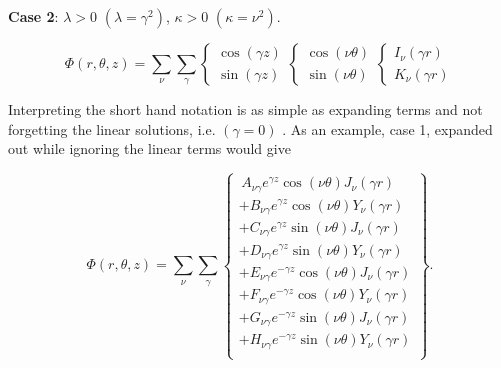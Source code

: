 \documentclass[12pt]{article}
\begin{document}
{\bf Case 2}: $\lambda > 0$ $(\lambda = \gamma^2)$, $\kappa > 0$ $(\kappa = \nu^2)$.

\begin{equation}
\Phi \left ( r,\theta,z \right) =  \sum_{\nu} \sum_{\gamma} \left \{ \begin{array}{c}
        \cos (\gamma z) \\
        \sin (\gamma z)
           \end{array} \right .
     \left \{ \begin{array}{c}
        \cos (\nu \theta) \\
        \sin (\nu \theta)
           \end{array} \right .
        \left \{ \begin{array}{c}
        I_{\nu}(\gamma  r) \\
        K_{\nu}(\gamma  r)
           \end{array} \right .
\end{equation}

Interpreting the short hand notation is as simple as expanding terms and not forgetting the linear solutions, i.e. $(\gamma = 0)$ .
As an example, case 1, expanded out while ignoring the linear terms would give

\begin{equation}
\Phi \left ( r,\theta,z \right) =  \sum_{\nu} \sum_{\gamma}  \left \{ \begin{array}{c}
   \,  A_{\nu \gamma} e^{\gamma z} \cos (\nu \theta) J_{\nu}(\gamma  r) \\
   + B_{\nu \gamma} e^{\gamma z} \cos (\nu \theta) Y_{\nu}(\gamma  r) \\
   + C_{\nu \gamma} e^{\gamma z} \sin (\nu \theta) J_{\nu}(\gamma  r) \\
   + D_{\nu \gamma} e^{\gamma z} \sin (\nu \theta) Y_{\nu}(\gamma  r) \\
   + E_{\nu \gamma} e^{-\gamma z} \cos (\nu \theta) J_{\nu}(\gamma  r) \\
   + F_{\nu \gamma} e^{-\gamma z} \cos (\nu \theta) Y_{\nu}(\gamma  r) \\
   + G_{\nu \gamma} e^{-\gamma z} \sin (\nu \theta) J_{\nu}(\gamma  r) \\
   + H_{\nu \gamma} e^{-\gamma z} \sin (\nu \theta) Y_{\nu}(\gamma  r) \\

     \end{array} \right \} .
\end{equation}
\end{document}
